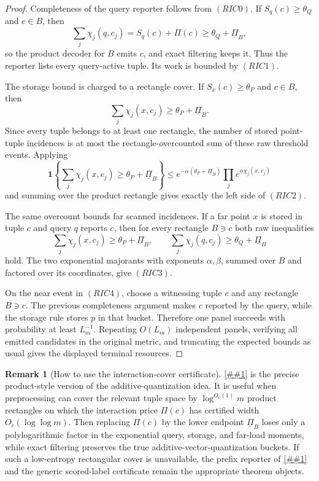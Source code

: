 \documentclass[10pt]{article}
\newcommand{\cref}[1]{\ref{##1}}
\newcommand{\Cref}[1]{\ref{##1}}
\theoremstyle{definition}
\newtheorem{remark}[theorem]{Remark}
\begin{document}
\begin{proof}
   Completeness of the query reporter follows from \((RIC0)\).  If
   \(S_q(c)\ge\theta_Q\) and \(c\in B\), then
   \[
      \sum_j\chi_j(q,c_j)=S_q(c)+\Pi(c)
      \ge \theta_Q+\underline\Pi_B,
   \]
   so the product decoder for \(B\) emits \(c\), and exact filtering keeps it.
   Thus the reporter lists every query-active tuple.  Its work is bounded by
   \((RIC1)\).

   The storage bound is charged to a rectangle cover.  If \(S_x(c)\ge
   \theta_P\) and \(c\in B\), then
   \[
      \sum_j\chi_j(x,c_j)\ge\theta_P+\underline\Pi_B.
   \]
   Since every tuple belongs to at least one rectangle, the number of stored
   point-tuple incidences is at most the rectangle-overcounted sum of these raw
   threshold events.  Applying
   \[
      \mathbf 1\!\left\{\sum_j\chi_j(x,c_j)\ge
      \theta_P+\underline\Pi_B\right\}
      \le
      e^{-\alpha(\theta_P+\underline\Pi_B)}
      \prod_j e^{\alpha\chi_j(x,c_j)}
   \]
   and summing over the product rectangle gives exactly the left side of
   \((RIC2)\).

   The same overcount bounds far scanned incidences.  If a far point \(x\) is
   stored in tuple \(c\) and query \(q\) reports \(c\), then for every rectangle
   \(B\ni c\) both raw inequalities
   \[
      \sum_j\chi_j(x,c_j)\ge\theta_P+\underline\Pi_B,
      \qquad
      \sum_j\chi_j(q,c_j)\ge\theta_Q+\underline\Pi_B
   \]
   hold.  The two exponential majorants with exponents \(\alpha,\beta\), summed
   over \(B\) and factored over its coordinates, give \((RIC3)\).

   On the near event in \((RIC4)\), choose a witnessing tuple \(c\) and any
   rectangle \(B\ni c\).  The previous completeness argument makes \(c\)
   reported by the query, while the storage rule stores \(p\) in that bucket.
   Therefore one panel succeeds with probability at least \(L_m^{-1}\).
   Repeating \(O(L_m)\) independent panels, verifying all emitted candidates in
   the original metric, and truncating the expected bounds as usual gives the
   displayed terminal resources.
\end{proof}

\begin{remark}[How to use the interaction-cover certificate]
   \label{rem:interaction-cover-certificate}
   \Cref{prop:rectangular-interaction-cover-aq} is the precise product-style
   version of the additive-quantization idea.  It is useful when preprocessing
   can cover the relevant tuple space by \(\log^{O_c(1)}m\) product rectangles
   on which the interaction price \(\Pi(c)\) has certified width
   \(O_c(\log\log m)\).  Then replacing \(\Pi(c)\) by the lower endpoint
   \(\underline\Pi_B\) loses only a polylogarithmic factor in the exponential
   query, storage, and far-load moments, while exact filtering preserves the
   true additive-vector-quantization buckets.  If such a low-entropy
   rectangular cover is unavailable, the prefix reporter of
   \cref{lem:priced-prefix-additive-ivf-reporter} and the generic scored-label
   certificate remain the appropriate theorem objects.
\end{remark}
\end{document}
